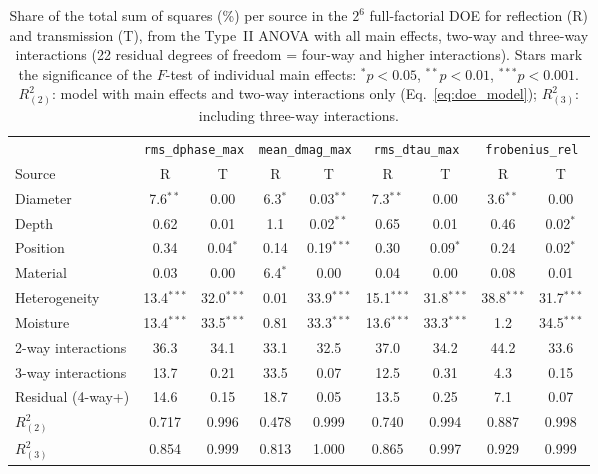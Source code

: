 \begin{table}[t]
\centering
\caption{Share of the total sum of squares (\%) per source in the $2^{6}$ full-factorial DOE for reflection (R) and transmission (T), from the Type~II ANOVA with all main effects, two-way and three-way interactions (22 residual degrees of freedom = four-way and higher interactions). Stars mark the significance of the $F$-test of individual main effects: $^{*}p<0.05$, $^{**}p<0.01$, $^{***}p<0.001$. $R^2_{(2)}$: model with main effects and two-way interactions only (Eq.~\ref{eq:doe_model}); $R^2_{(3)}$: including three-way interactions.}
\label{tab:anova_variance_shares}
\begin{tabular}{lcccccccc}
\hline
 & \multicolumn{2}{c}{\texttt{rms\_dphase\_max}} & \multicolumn{2}{c}{\texttt{mean\_dmag\_max}} & \multicolumn{2}{c}{\texttt{rms\_dtau\_max}} & \multicolumn{2}{c}{\texttt{frobenius\_rel}} \\
\cline{2-3} \cline{4-5} \cline{6-7} \cline{8-9}
Source & R & T & R & T & R & T & R & T \\
\hline
Diameter & 7.6$^{**}$ & 0.00 & 6.3$^{*}$ & 0.03$^{**}$ & 7.3$^{**}$ & 0.00 & 3.6$^{**}$ & 0.00 \\
Depth & 0.62 & 0.01 & 1.1 & 0.02$^{**}$ & 0.65 & 0.01 & 0.46 & 0.02$^{*}$ \\
Position & 0.34 & 0.04$^{*}$ & 0.14 & 0.19$^{***}$ & 0.30 & 0.09$^{*}$ & 0.24 & 0.02$^{*}$ \\
Material & 0.03 & 0.00 & 6.4$^{*}$ & 0.00 & 0.04 & 0.00 & 0.08 & 0.01 \\
Heterogeneity & 13.4$^{***}$ & 32.0$^{***}$ & 0.01 & 33.9$^{***}$ & 15.1$^{***}$ & 31.8$^{***}$ & 38.8$^{***}$ & 31.7$^{***}$ \\
Moisture & 13.4$^{***}$ & 33.5$^{***}$ & 0.81 & 33.3$^{***}$ & 13.6$^{***}$ & 33.3$^{***}$ & 1.2 & 34.5$^{***}$ \\
2-way interactions & 36.3 & 34.1 & 33.1 & 32.5 & 37.0 & 34.2 & 44.2 & 33.6 \\
3-way interactions & 13.7 & 0.21 & 33.5 & 0.07 & 12.5 & 0.31 & 4.3 & 0.15 \\
Residual (4-way+) & 14.6 & 0.15 & 18.7 & 0.05 & 13.5 & 0.25 & 7.1 & 0.07 \\
\hline
$R^2_{(2)}$ & 0.717 & 0.996 & 0.478 & 0.999 & 0.740 & 0.994 & 0.887 & 0.998 \\
$R^2_{(3)}$ & 0.854 & 0.999 & 0.813 & 1.000 & 0.865 & 0.997 & 0.929 & 0.999 \\
\hline
\end{tabular}
\end{table}
